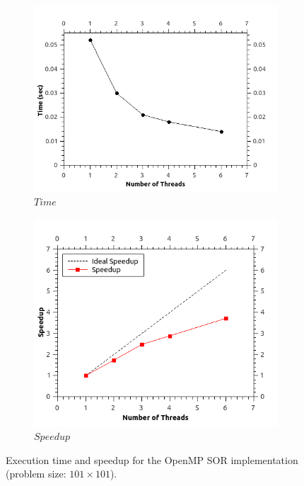 \documentclass[11pt]{report}
\begin{document}
\begin{figure}[th!]
\centering
\begin{subfigure}{0.45\textwidth}
  \centering
  \includegraphics[width=0.8\linewidth]{images/sor_time_101}
  \caption{$Time$}
\end{subfigure}
\begin{subfigure}{0.45\textwidth}
  \centering
  \includegraphics[width=0.8\linewidth]{images/sor_speedup_101}
  \caption{$Speedup$}
\end{subfigure}
\caption{Execution time and speedup for the OpenMP SOR implementation (problem size: $101 \times 101$). }
\label{fig:example5.7}
\end{figure}
\end{document}
